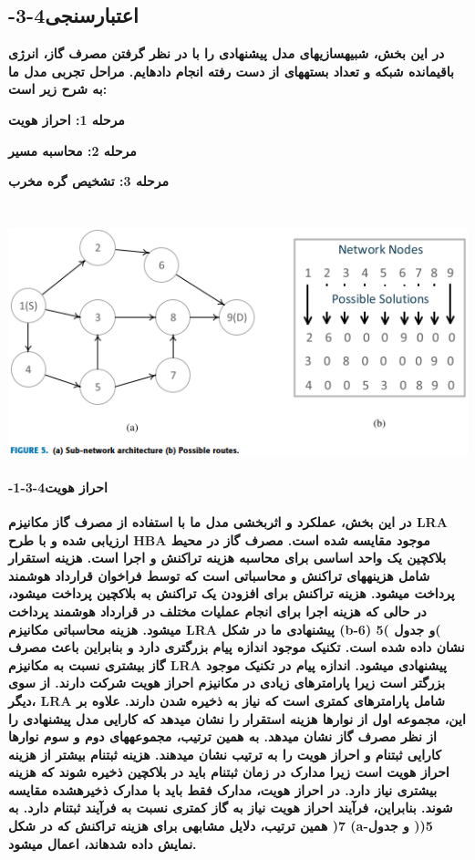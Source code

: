 \documentclass{article} %
\begin{document}
\noindent 
\subsection{ -3-4اعتبارسنجی}

\noindent 
{\bf در این بخش، شبیهسازیهای مدل پیشنهادی را با در نظر گرفتن مصرف گاز، انرژی باقیمانده شبکه و تعداد بستههای از دست رفته انجام دادهایم. مراحل تجربی مدل ما به شرح زیر است:}

\noindent 
{\bf  مرحله 1: احراز هویت}

\noindent 
{\bf  مرحله 2: محاسبه مسیر}

\noindent 
{\bf  مرحله 3: تشخیص گره مخرب}

\noindent 
\paragraph{\includegraphics*[width=6.69in, height=3.04in]{image14} -1-3-4احراز هویت}

\noindent 
{\bf در این بخش، عملکرد و اثربخشی مدل ما با استفاده از مصرف گاز مکانیزم LRA ارزیابی شده و با طرح HBA موجود مقایسه شده است. مصرف گاز در محیط بلاکچین یک واحد اساسی برای محاسبه هزینه تراکنش و اجرا است. هزینه استقرار شامل هزینههای تراکنش و محاسباتی است که توسط فراخوان قرارداد هوشمند پرداخت میشود. هزینه تراکنش برای افزودن یک تراکنش به بلاکچین پرداخت میشود، در حالی که هزینه اجرا برای انجام عملیات مختلف در قرارداد هوشمند پرداخت میشود. هزینه محاسباتی مکانیزم LRA پیشنهادی ما در شکل (b-6) و جدول )5( نشان داده شده است. تکنیک موجود اندازه پیام بزرگتری دارد و بنابراین باعث مصرف گاز بیشتری نسبت به مکانیزم LRA پیشنهادی میشود. اندازه پیام در تکنیک موجود بزرگتر است زیرا پارامترهای زیادی در مکانیزم احراز هویت شرکت دارند. از سوی دیگر، LRA شامل پارامترهای کمتری است که نیاز به ذخیره شدن دارند. علاوه بر این، مجموعه اول از نوارها هزینه استقرار را نشان میدهد که کارایی مدل پیشنهادی را از نظر مصرف گاز نشان میدهد. به همین ترتیب، مجموعههای دوم و سوم نوارها کارایی ثبتنام و احراز هویت را به ترتیب نشان میدهند. هزینه ثبتنام بیشتر از هزینه احراز هویت است زیرا مدارک در زمان ثبتنام باید در بلاکچین ذخیره شوند که هزینه بیشتری نیاز دارد. در احراز هویت، مدارک فقط باید با مدارک ذخیرهشده مقایسه شوند. بنابراین، فرآیند احراز هویت نیاز به گاز کمتری نسبت به فرآیند ثبتنام دارد. به همین ترتیب، دلایل مشابهی برای هزینه تراکنش که در شکل )7 (a-و جدول )5( نمایش داده شدهاند، اعمال میشود.}
\end{document}
